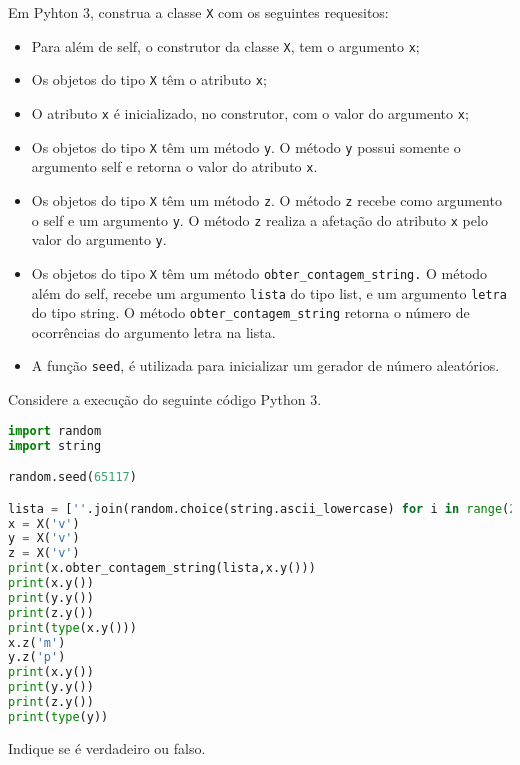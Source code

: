 \documentclass[12pt,varwidth=16cm,border=17pt]{standalone}
\begin{document}
Em Pyhton 3, construa a classe \verb+X+ com os seguintes requesitos:

\begin{itemize}

  \item Para além de self, o construtor da classe \verb+X+, tem o argumento \verb+x+;
  \item Os objetos do tipo \verb+X+ têm o atributo \verb+x+;
  \item O atributo \verb+x+ é inicializado, no construtor, com o valor
	do argumento \verb+x+;
  \item Os objetos do tipo \verb+X+ têm um método \verb+y+. O
    método \verb+y+ possui somente o argumento self e retorna o valor do atributo \verb+x+.
	
  \item Os objetos do tipo \verb+X+ têm um método \verb+z+. O
    método \verb+z+ recebe como argumento o self e um argumento \verb+y+. 
	O método \verb+z+ realiza a afetação do atributo \verb+x+ pelo valor do argumento \verb+y+.
    
 \item Os objetos do tipo \verb+X+ têm um método \verb+obter_contagem_string.+ O
    método além do self, recebe um argumento \verb+lista+ do tipo list, e um argumento \verb+letra+ do tipo string. O método \verb+obter_contagem_string+ retorna o número de ocorrências do argumento letra na lista.
    
 \item A função \verb+seed+, é utilizada para inicializar um gerador de número aleatórios.
    
\end{itemize}

Considere a execução do seguinte código Python 3.






\begin{lstlisting}[language=Python]
import random
import string

random.seed(65117)

lista = [''.join(random.choice(string.ascii_lowercase) for i in range(2)) for i in range(300)]
x = X('v')
y = X('v')
z = X('v')
print(x.obter_contagem_string(lista,x.y()))
print(x.y())
print(y.y())
print(z.y())
print(type(x.y()))
x.z('m')
y.z('p')
print(x.y())
print(y.y())
print(z.y())
print(type(y))
\end{lstlisting}

Indique se é verdadeiro ou falso.
\end{document}
